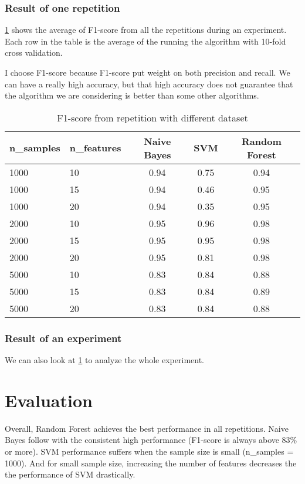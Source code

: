 \documentclass[conference]{IEEEtran}
\begin{document}
\subsubsection*{Result of one repetition}
\cref{tab:result_repetition} shows the average of F1-score from all the repetitions during an experiment. Each row in the table is the average of the running the algorithm with 10-fold cross validation.

I choose F1-score because F1-score put weight on both precision and recall. We can have a really high accuracy, but that high accuracy does not guarantee that the algorithm we are considering is better than some other algorithms.

\begin{table}[h]
\centering
\caption{F1-score from repetition with different dataset}
\label{tab:result_repetition}
\begin{tabular}{l|l|c|c|c}
n\_samples & n\_features & Naive Bayes & SVM & Random Forest \\
\toprule
1000 & 10 & 0.94 & 0.75 & 0.94 \\ 
1000 & 15 & 0.94 & 0.46 & 0.95 \\ 
1000 & 20 & 0.94 & 0.35 & 0.95 \\ 
2000 & 10 & 0.95 & 0.96 & 0.98 \\ 
2000 & 15 & 0.95 & 0.95 & 0.98 \\ 
2000 & 20 & 0.95 & 0.81 & 0.98 \\ 
5000 & 10 & 0.83 & 0.84 & 0.88 \\ 
5000 & 15 & 0.83 & 0.84 & 0.89 \\ 
5000 & 20 & 0.83 & 0.84 & 0.88 \\ 
\bottomrule
\end{tabular}
\end{table}

\subsubsection*{Result of an experiment}
We can also look at \cref{tab:result_repetition} to analyze the whole experiment.


\section{Evaluation}
Overall, Random Forest achieves the best performance in all repetitions. Naive Bayes follow with the consistent high performance (F1-score is always above 83\% or more). SVM performance suffers when the sample size is small (n_samples = 1000). And for small sample size, increasing the number of features decreases the  the performance of SVM drastically.
\end{document}
